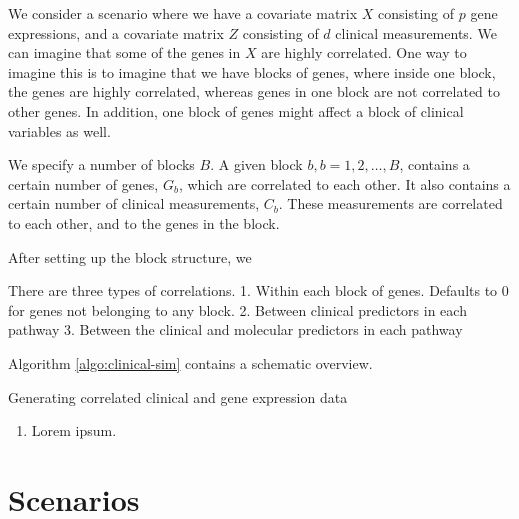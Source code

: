 We consider a scenario where we have a covariate matrix $X$ consisting of $p$ gene expressions, and a covariate matrix $Z$ consisting of $d$ clinical measurements.
We can imagine that some of the genes in $X$ are highly correlated.
One way to imagine this is to imagine that we have blocks of genes,
where inside one block, the genes are highly correlated, whereas genes in one block are not correlated to other genes.
In addition, one block of genes might affect a block of clinical variables as well.

We specify a number of blocks $B$. A given block $b,b=1,2,\ldots,B$, contains a certain number of genes, $G_b$, which are correlated to each other.
It also contains a certain number of clinical measurements, $C_b$. These measurements are correlated to each other, and to the genes in the block.

After setting up the block structure, we 

There are three types of correlations.
1. Within each block of genes. Defaults to 0 for genes not belonging to any block.
2. Between clinical predictors in each pathway
3. Between the clinical and molecular predictors in each pathway

Algorithm \ref{algo:clinical-sim} contains a schematic overview.

\begin{algorithm}
\caption{Generating correlated clinical and gene expression data}
\label{algo:clinical-sim}
\begin{enumerate}
    \item Lorem ipsum.
\end{enumerate}
\end{algorithm}

\section{Scenarios}
